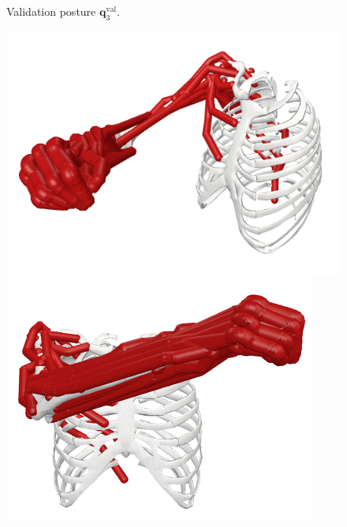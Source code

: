 \begin{figure}[!htb]
\begin{minipage}{0.25\linewidth}
    \end{minipage}
    \caption{Validation posture $\mathbf{q}_3^{\text{val}}$.}
    \label{fig:pose_val_3}
\end{figure}

\begin{figure}[!htb]
    \centering
    \captionsetup{justification=centering}
    \begin{minipage}{0.3\linewidth}
        \centering
        \includegraphics[trim={0 0 0 0}, clip, width=0.8\linewidth]{img/chapter_4/pose_10_view.png}
    \end{minipage}
    \hfill
    \begin{minipage}{0.3\linewidth}
        \captionsetup{justification=centering}
        \centering
        \includegraphics[trim={0 0 0 0}, clip, width=0.8\linewidth]{img/chapter_4/pose_10_front.png}
    \end{minipage}
    \hfill
    \begin{minipage}{0.3\linewidth}
        \captionsetup{justification=centering}

\end{minipage}
\end{figure}
